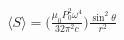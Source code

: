 

\vspace*{\fill}
\centering

\begin{align*}
    \langle S \rangle = \Bigg( \frac{\mu_0 P_0^2 \omega^{4}}{32 \pi^2 c} \Bigg) \frac{\sin^2{\theta}}{r^2}
\end{align*}

\centering
\vspace*{\fill}

